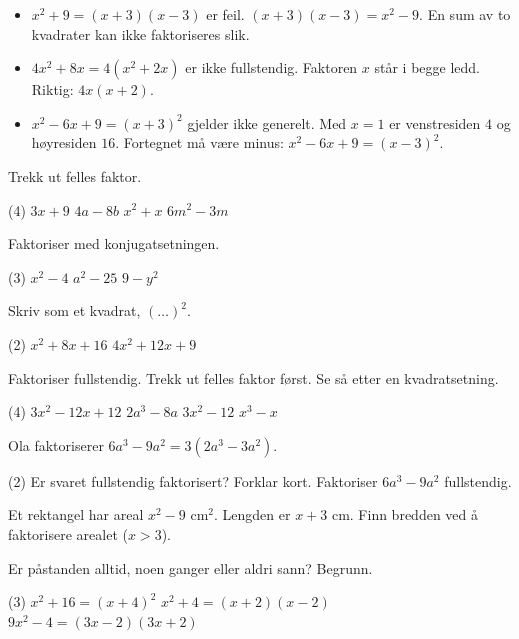 \begin{vanligfeil}
\begin{itemize}[leftmargin=1.2em,itemsep=1pt,topsep=0pt]
  \item $x^2 + 9 = (x+3)(x-3)$ er feil. $(x+3)(x-3) = x^2 - 9$. En sum av to kvadrater kan ikke faktoriseres slik.
  \item $4x^2 + 8x = 4(x^2 + 2x)$ er ikke fullstendig. Faktoren $x$ står i begge ledd. Riktig: $4x(x+2)$.
  \item $x^2 - 6x + 9 = (x+3)^2$ gjelder ikke generelt. Med $x = 1$ er venstresiden $4$ og høyresiden $16$. Fortegnet må være minus: $x^2 - 6x + 9 = (x-3)^2$.
\end{itemize}
\end{vanligfeil}


Trekk ut felles faktor.
\begin{tasks}(4)
  \task $3x + 9$
  \task $4a - 8b$
  \task $x^2 + x$
  \task $6m^2 - 3m$
\end{tasks}

Faktoriser med konjugatsetningen.
\begin{tasks}(3)
  \task $x^2 - 4$
  \task $a^2 - 25$
  \task $9 - y^2$
\end{tasks}

Skriv som et kvadrat, $(\ldots)^2$.
\begin{tasks}(2)
  \task $x^2 + 8x + 16$
  \task $4x^2 + 12x + 9$
\end{tasks}


Faktoriser fullstendig. Trekk ut felles faktor først. Se så etter en kvadratsetning.
\begin{tasks}(4)
  \task $3x^2 - 12x + 12$
  \task $2a^3 - 8a$
  \task $3x^2 - 12$
  \task $x^3 - x$
\end{tasks}

Ola faktoriserer $6a^3 - 9a^2 = 3(2a^3 - 3a^2)$.
\begin{tasks}(2)
  \task Er svaret fullstendig faktorisert? Forklar kort.
  \task Faktoriser $6a^3 - 9a^2$ fullstendig.
\end{tasks}

Et rektangel har areal $x^2 - 9$ cm$^2$. Lengden er $x + 3$ cm. Finn bredden ved å faktorisere arealet ($x > 3$).


Er påstanden alltid, noen ganger eller aldri sann? Begrunn.
\begin{tasks}(3)
  \task $x^2 + 16 = (x+4)^2$
  \task $x^2 + 4 = (x+2)(x-2)$
  \task $9x^2 - 4 = (3x-2)(3x+2)$
\end{tasks}

